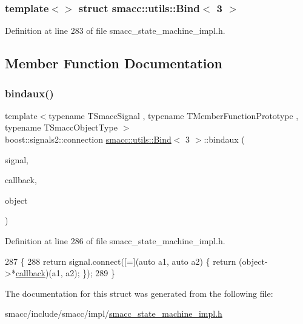 \subsubsection*{template$<$$>$\newline
struct smacc\+::utils\+::\+Bind$<$ 3 $>$}



Definition at line 283 of file smacc\+\_\+state\+\_\+machine\+\_\+impl.\+h.



\subsection{Member Function Documentation}
\mbox{\label{structsmacc_1_1utils_1_1Bind_3_013_01_4_a8958f16a2a40b187e6500a76cfaeed63}} 
\subsubsection{\texorpdfstring{bindaux()}{bindaux()}}
{\footnotesize\ttfamily template$<$typename T\+Smacc\+Signal , typename T\+Member\+Function\+Prototype , typename T\+Smacc\+Object\+Type $>$ \\
boost\+::signals2\+::connection \hyperlink{structsmacc_1_1utils_1_1Bind}{smacc\+::utils\+::\+Bind}$<$ 3 $>$\+::bindaux (\begin{DoxyParamCaption}\item[{T\+Smacc\+Signal \&}]{signal,  }\item[{T\+Member\+Function\+Prototype}]{callback,  }\item[{T\+Smacc\+Object\+Type $\ast$}]{object }\end{DoxyParamCaption})\hspace{0.3cm}{\ttfamily [inline]}}



Definition at line 286 of file smacc\+\_\+state\+\_\+machine\+\_\+impl.\+h.


\begin{DoxyCode}
287       \{
288         \textcolor{keywordflow}{return} signal.connect([=](\textcolor{keyword}{auto} a1, \textcolor{keyword}{auto} a2) \{ \textcolor{keywordflow}{return} (object->*\hyperlink{servers_2opencv__perception__node_2opencv__perception__node_8cpp_a050e697bd654facce10ea3f6549669b3}{callback})(a1, a2); \});
289       \}
\end{DoxyCode}


The documentation for this struct was generated from the following file\+:\begin{DoxyCompactItemize}
\item 
smacc/include/smacc/impl/\hyperlink{smacc__state__machine__impl_8h}{smacc\+\_\+state\+\_\+machine\+\_\+impl.\+h}\end{DoxyCompactItemize}
